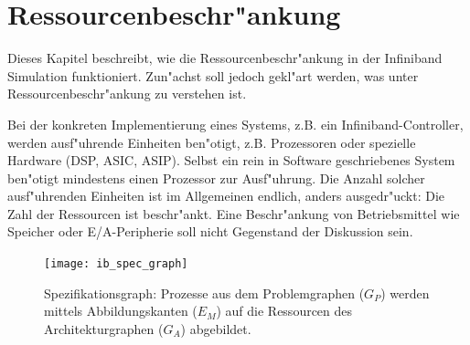 \chapter{\label{konzept}Ressourcenbeschr"ankung}
Dieses Kapitel beschreibt, wie die Ressourcenbeschr"ankung in der Infiniband
Simulation funktioniert. Zun"achst soll jedoch gekl"art werden, was unter
Ressourcenbeschr"ankung zu verstehen ist.

Bei der konkreten Implementierung eines Systems, z.B. ein
Infiniband-Controller, werden ausf"uhrende Einheiten ben"otigt,
z.B. Prozessoren oder spezielle Hardware (DSP, ASIC, ASIP).  Selbst ein rein
in Software geschriebenes System ben"otigt mindestens einen Prozessor zur
Ausf"uhrung. Die Anzahl solcher ausf"uhrenden Einheiten ist im Allgemeinen
endlich, anders ausgedr"uckt: Die Zahl der Ressourcen ist
beschr"ankt. Eine Beschr"ankung von Betriebsmittel wie Speicher oder
E/A-Peripherie soll nicht Gegenstand der Diskussion sein. 

\begin{figure}
\begin{center}
\texttt{[image: ib\_spec\_graph]}
\caption{Spezifikationsgraph: Prozesse aus dem Problemgraphen ($G_P$) werden mittels Abbildungskanten ($E_M$) auf die Ressourcen des Architekturgraphen ($G_A$) abgebildet.}
\label{fig:ib_spec_graph}
\end{center}
\end{figure}

